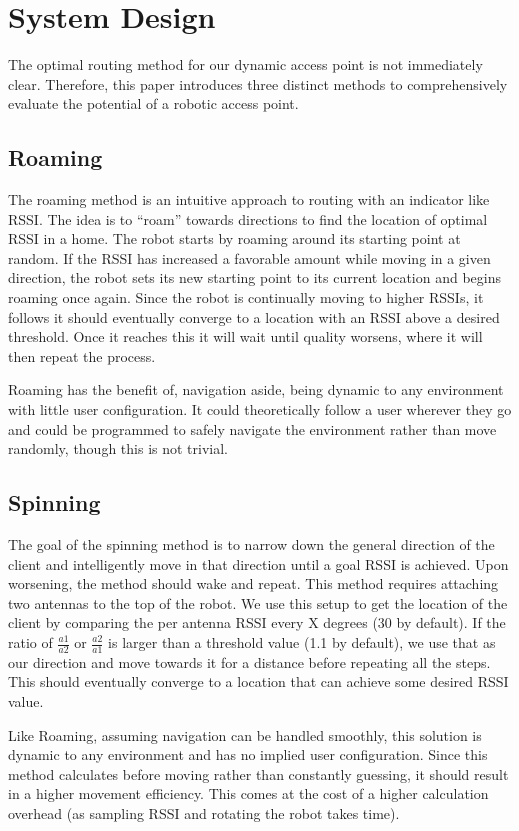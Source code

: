 \section{System Design}
The optimal routing method for our dynamic access point is not immediately clear. Therefore, this paper introduces three distinct methods to comprehensively evaluate the potential of a robotic access point.

\subsection{Roaming}
The roaming method is an intuitive approach to routing with an indicator like RSSI. The idea is to “roam” towards directions to find the location of optimal RSSI in a home. The robot starts by roaming around its starting point at random. If the RSSI has increased a favorable amount while moving in a given direction, the robot sets its new starting point to its current location and begins roaming once again. Since the robot is continually moving to higher RSSIs, it follows it should eventually converge to a location with an RSSI above a desired threshold. Once it reaches this it will wait until quality worsens, where it will then repeat the process.\par

Roaming has the benefit of, navigation aside, being dynamic to any environment with little user configuration. It could theoretically follow a user wherever they go and could be programmed to safely navigate the environment rather than move randomly, though this is not trivial.

\subsection{Spinning}
The goal of the spinning method is to narrow down the general direction of the client and intelligently move in that direction until a goal RSSI is achieved. Upon worsening, the method should wake and repeat. This method requires attaching two antennas to the top of the robot. We use this setup to get the location of the client by comparing the per antenna RSSI every X degrees (30 by default). If the ratio of \(\frac{a1}{a2}\) or \(\frac{a2}{a1}\) is larger than a threshold value (1.1 by default), we use that as our direction and move towards it for a distance before repeating all the steps. This should eventually converge to a location that can achieve some desired RSSI value.

Like Roaming, assuming navigation can be handled smoothly, this solution is dynamic to any environment and has no implied user configuration. Since this method calculates before moving rather than constantly guessing, it should result in a higher movement efficiency. This comes at the cost of a higher calculation overhead (as sampling RSSI and rotating the robot takes time).

